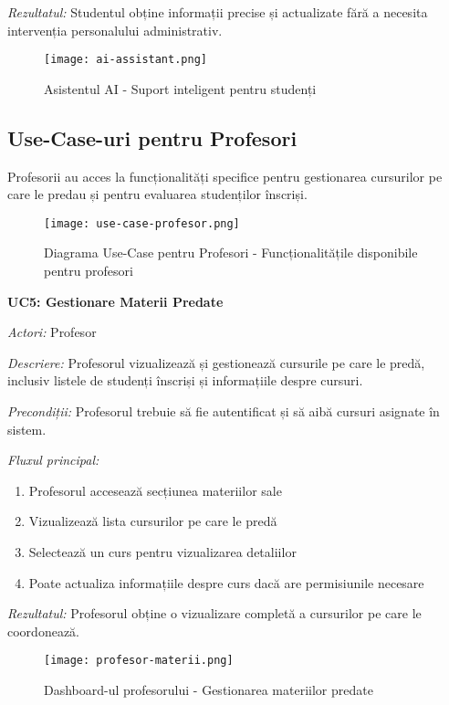 \documentclass[12pt,a4paper]{report}
\begin{document}
\textit{Rezultatul:} Studentul obține informații precise și actualizate fără a necesita intervenția personalului administrativ.

\begin{figure}[H]
\centering
\texttt{[image: ai-assistant.png]}
\caption{Asistentul AI - Suport inteligent pentru studenți}
\label{fig:ai-assistant}
\end{figure}

\subsection{Use-Case-uri pentru Profesori}

Profesorii au acces la funcționalități specifice pentru gestionarea cursurilor pe care le predau și pentru evaluarea studenților înscriși.

\begin{figure}[H]
\centering
\texttt{[image: use-case-profesor.png]}
\caption{Diagrama Use-Case pentru Profesori - Funcționalitățile disponibile pentru profesori}
\label{fig:use-case-profesor}
\end{figure}

\textbf{UC5: Gestionare Materii Predate}

\textit{Actori:} Profesor

\textit{Descriere:} Profesorul vizualizează și gestionează cursurile pe care le predă, inclusiv listele de studenți înscriși și informațiile despre cursuri.

\textit{Precondiții:} Profesorul trebuie să fie autentificat și să aibă cursuri asignate în sistem.

\textit{Fluxul principal:}
\begin{enumerate}
\item Profesorul accesează secțiunea materiilor sale
\item Vizualizează lista cursurilor pe care le predă
\item Selectează un curs pentru vizualizarea detaliilor
\item Poate actualiza informațiile despre curs dacă are permisiunile necesare
\end{enumerate}

\textit{Rezultatul:} Profesorul obține o vizualizare completă a cursurilor pe care le coordonează.

\begin{figure}[H]
\centering
\texttt{[image: profesor-materii.png]}
\caption{Dashboard-ul profesorului - Gestionarea materiilor predate}
\label{fig:profesor-materii}
\end{figure}
\end{document}

